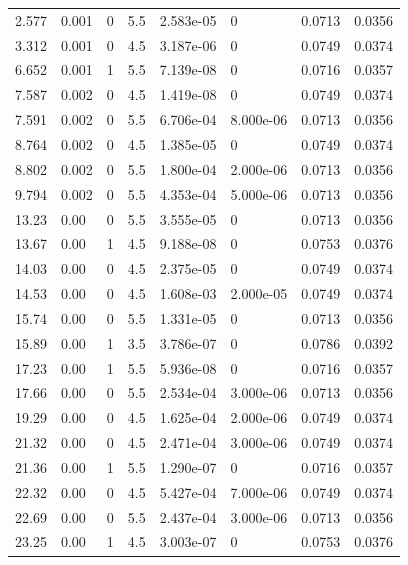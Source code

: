 \documentclass[preview]{standalone}
\begin{document}
{{\begin{tabular}{L{1.2cm}C{1.2cm} C{0.3cm}C{0.5cm} C{1.4cm}C{1.4cm} C{1.4cm}C{1.4cm}}
  2.577  &  0.001  & 0     & 5.5 &  2.583e-05  & 0  & 0.0713 &  0.0356   \\ 
  3.312  &  0.001  & 0     & 4.5 &  3.187e-06  & 0  & 0.0749 &  0.0374   \\ 
  6.652  &  0.001  & 1     & 5.5 &  7.139e-08  & 0  & 0.0716 &  0.0357   \\ 
  7.587  &  0.002  & 0     & 4.5 &  1.419e-08  & 0  & 0.0749 &  0.0374   \\ 
  7.591  &  0.002  & 0     & 5.5 &  6.706e-04  & 8.000e-06  & 0.0713 &  0.0356   \\ 
  8.764  &  0.002  & 0     & 4.5 &  1.385e-05  & 0  & 0.0749 &  0.0374   \\ 
  8.802  &  0.002  & 0     & 5.5 &  1.800e-04  & 2.000e-06  & 0.0713 &  0.0356   \\ 
  9.794  &  0.002  & 0     & 5.5 &  4.353e-04  & 5.000e-06  & 0.0713 &  0.0356   \\ 
  13.23  &  0.00  & 0     & 5.5 &  3.555e-05  & 0  & 0.0713 &  0.0356   \\ 
  13.67  &  0.00  & 1     & 4.5 &  9.188e-08  & 0  & 0.0753 &  0.0376   \\ 
  14.03  &  0.00  & 0     & 4.5 &  2.375e-05  & 0  & 0.0749 &  0.0374   \\ 
  14.53  &  0.00  & 0     & 4.5 &  1.608e-03  & 2.000e-05  & 0.0749 &  0.0374   \\ 
  15.74  &  0.00  & 0     & 5.5 &  1.331e-05  & 0  & 0.0713 &  0.0356   \\ 
  15.89  &  0.00  & 1     & 3.5 &  3.786e-07  & 0  & 0.0786 &  0.0392   \\ 
  17.23  &  0.00  & 1     & 5.5 &  5.936e-08  & 0  & 0.0716 &  0.0357   \\ 
  17.66  &  0.00  & 0     & 5.5 &  2.534e-04  & 3.000e-06  & 0.0713 &  0.0356   \\ 
  19.29  &  0.00  & 0     & 4.5 &  1.625e-04  & 2.000e-06  & 0.0749 &  0.0374   \\ 
  21.32  &  0.00  & 0     & 4.5 &  2.471e-04  & 3.000e-06  & 0.0749 &  0.0374   \\ 
  21.36  &  0.00  & 1     & 5.5 &  1.290e-07  & 0  & 0.0716 &  0.0357   \\ 
  22.32  &  0.00  & 0     & 4.5 &  5.427e-04  & 7.000e-06  & 0.0749 &  0.0374   \\ 
  22.69  &  0.00  & 0     & 5.5 &  2.437e-04  & 3.000e-06  & 0.0713 &  0.0356   \\ 
  23.25  &  0.00  & 1     & 4.5 &  3.003e-07  & 0  & 0.0753 &  0.0376   \\ 

\end{tabular}}}
\end{document}
